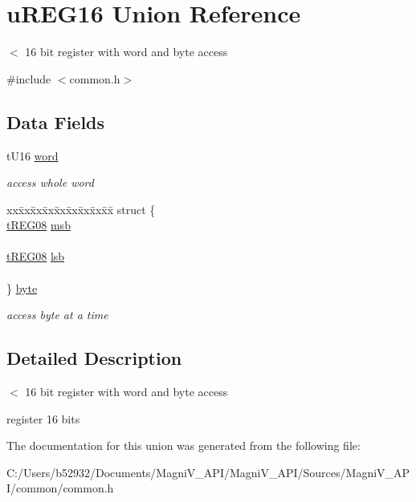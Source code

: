 \hypertarget{unionu_r_e_g16}{}\section{u\+R\+E\+G16 Union Reference}
\label{unionu_r_e_g16}


$<$ 16 bit register with word and byte access  




{\ttfamily \#include $<$common.\+h$>$}

\subsection*{Data Fields}
\begin{DoxyCompactItemize}
\item 
\hypertarget{unionu_r_e_g16_a740c6e01add2b9960472a1c87ee4e013}{}t\+U16 \hyperlink{unionu_r_e_g16_a740c6e01add2b9960472a1c87ee4e013}{word}\label{unionu_r_e_g16_a740c6e01add2b9960472a1c87ee4e013}

\begin{DoxyCompactList}\small\item\em access whole word \end{DoxyCompactList}\item 
\hypertarget{unionu_r_e_g16_ace903a87f903f8a3c0bf66c235fc93dc}{}\begin{tabbing}
xx\=xx\=xx\=xx\=xx\=xx\=xx\=xx\=xx\=\kill
struct \{\\
\>\hyperlink{unionu_r_e_g08}{tREG08} \hyperlink{unionu_r_e_g16_a8ab3670a1b1c7fc4e5e6c0df2bc60748}{msb}\\
\>\\
\>\hyperlink{unionu_r_e_g08}{tREG08} \hyperlink{unionu_r_e_g16_a228f29efa5ff0b9d9d7a0460241a86e0}{lsb}\\
\>\\
\} \hyperlink{unionu_r_e_g16_ace903a87f903f8a3c0bf66c235fc93dc}{byte}\label{unionu_r_e_g16_ace903a87f903f8a3c0bf66c235fc93dc}
\\

\end{tabbing}\begin{DoxyCompactList}\small\item\em access byte at a time \end{DoxyCompactList}\end{DoxyCompactItemize}


\subsection{Detailed Description}
$<$ 16 bit register with word and byte access 

register 16 bits 

The documentation for this union was generated from the following file\+:\begin{DoxyCompactItemize}
\item 
C\+:/\+Users/b52932/\+Documents/\+Magni\+V\+\_\+\+A\+P\+I/\+Magni\+V\+\_\+\+A\+P\+I/\+Sources/\+Magni\+V\+\_\+\+A\+P\+I/common/common.\+h\end{DoxyCompactItemize}
